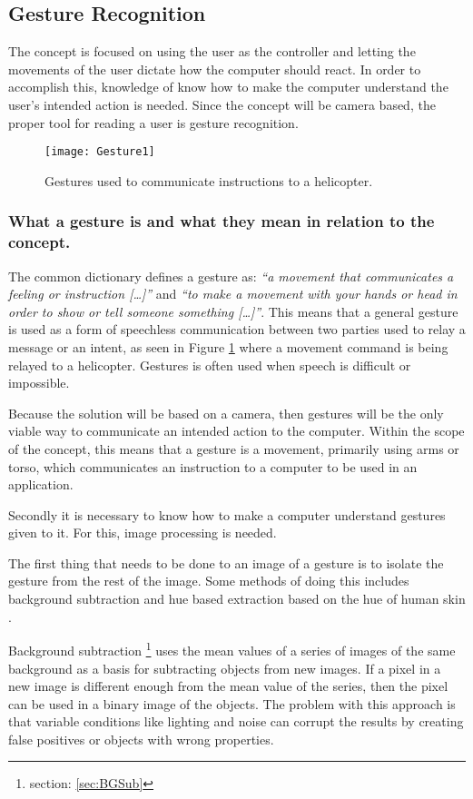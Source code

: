 \subsection{Gesture Recognition}
The concept is focused on using the user as the controller and letting the movements of the user dictate how the computer should react. In order to accomplish this, knowledge of know how to make the computer understand the user’s intended action is needed. Since the concept will be camera based, the proper tool for reading a user is gesture recognition.
\bigskip

\begin{figure}[h] 
\centering
\texttt{[image: Gesture1]} 
\caption{Gestures used to communicate instructions to a helicopter.}
\label{fig:Gesture1}
\end{figure}

\subsubsection*{What a gesture is and what they mean in relation to the concept.}
The common dictionary defines a gesture as: \textit{“a movement that communicates a feeling or instruction […]”} and \textit{“to make a movement with your hands or head in order to show or tell someone something […]”}. \parencite{Macmillan2005}
This means that a general gesture is used as a form of speechless communication between two parties used to relay a message or an intent, as seen in Figure \ref{fig:Gesture1} where a movement command is being relayed to a helicopter. Gestures is often used when speech is difficult or impossible.

Because the solution will be based on a camera, then gestures will be the only viable way to communicate an intended action to the computer. Within the scope of the concept, this means that a gesture is a movement, primarily using arms or torso, which communicates an instruction to a computer to be used in an application.
\bigskip

Secondly it is necessary to know how to make a computer understand gestures given to it. For this, image processing is needed.

The first thing that needs to be done to an image of a gesture is to isolate the gesture from the rest of the image. Some methods of doing this includes background subtraction and hue based extraction based on the hue of human skin \parencite{Busaryev}.
\bigskip

Background subtraction \footnote{section: \ref{sec:BGSub}} uses the mean values of a series of images of the same background as a basis for subtracting objects from new images. If a pixel in a new image is different enough from the mean value of the series, then the pixel can be used in a binary image of the objects. The problem with this approach is that variable conditions like lighting and noise can corrupt the results by creating false positives or objects with wrong properties. \parencite{Busaryev}
\bigskip

